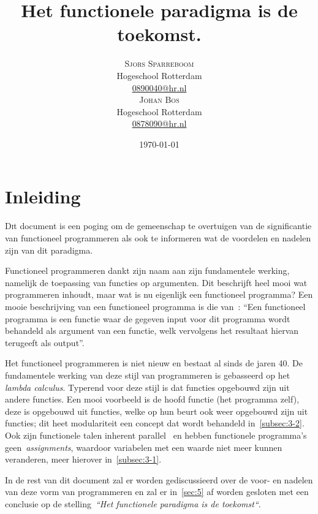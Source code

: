 \documentclass[twoside,twocolumn]{article}
\title{Het functionele paradigma is de toekomst.} %
\author{%
  \textsc{Sjors Sparreboom} \\[1ex] %
\normalsize Hogeschool Rotterdam \\ %
\normalsize \href{mailto:0890040@hr.nl}{0890040@hr.nl} \\[2ex] %
\textsc{Johan Bos} \\[1ex] %
\normalsize Hogeschool Rotterdam \\ %
\normalsize \href{mailto:0878090@hr.nl}{0878090@hr.nl} %
}
\date{\today} %
\begin{document}
\nocite{*}

\maketitle


\section{Inleiding}
\label{sec:1}
\lettrine[nindent=0em,lines=3]{D}it document is een poging om de gemeenschap te
overtuigen van de significantie van functioneel programmeren als ook te
informeren wat de voordelen en nadelen zijn van dit paradigma.

Functioneel programmeren dankt zijn naam aan zijn fundamentele werking,
namelijk de toepassing van functies op argumenten. Dit beschrijft heel mooi wat
programmeren inhoudt, maar wat is nu eigenlijk een functioneel programma? Een
mooie beschrijving van een functioneel programma is die van~\textcite{src1}:
\enquote{Een functioneel programma is een functie waar de gegeven input voor
dit programma wordt behandeld als argument van een functie, welk vervolgens het
resultaat hiervan terugeeft als output}.

Het functioneel programmeren is niet nieuw en bestaat al sinds de jaren 40. De
fundamentele werking van deze stijl van programmeren is gebasseerd op
het \textit{lambda calculus}\cite{src2,src3}. Typerend voor deze stijl is dat
functies opgebouwd zijn uit andere functies. Een mooi voorbeeld is de hoofd
functie (het programma zelf), deze is opgebouwd uit functies, welke op hun
beurt ook weer opgebouwd zijn uit functies; dit heet modulariteit een concept
dat wordt behandeld in~\cref{subsec:3-2}. Ook zijn functionele talen inherent
parallel~\cite{src4,src12} en hebben functionele programma's
geen~\textit{assignments}, waardoor variabelen met een waarde niet meer kunnen
veranderen, meer hierover in~\cref{subsec:3-1}.

In de rest van dit document zal er worden gediscussieerd over de voor- en
nadelen van deze vorm van programmeren en zal er in~\cref{sec:5} af worden
gesloten met een conclusie op de stelling~\textit{``Het functionele paradigma
is de toekomst``}.

\end{document}
